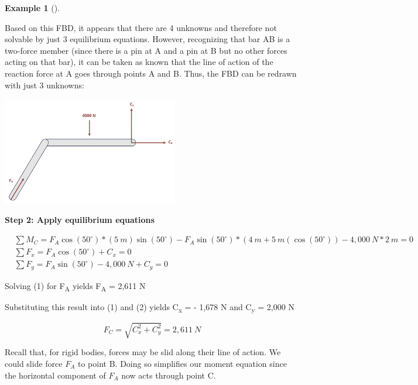 \documentclass[
  letterpaper,
  DIV=11,
  numbers=noendperiod]{scrreprt}
\theoremstyle{definition}
\newtheorem{example}{Example}[chapter]
\theoremstyle{remark}
\begin{document}
\begin{tcolorbox}
\begin{example}[]
\begin{tcolorbox}
Based on this FBD, it appears that there are 4 unknowns and therefore
not solvable by just 3 equilibrium equations. However, recognizing that
bar AB is a two-force member (since there is a pin at A and a pin at B
but no other forces acting on that bar), it can be taken as known that
the line of action of the reaction force at A goes through points A and
B. Thus, the FBD can be redrawn with just 3 unknowns:

\begin{center}
\includegraphics[width=3.03125in,height=\textheight]{images/Updated CH1 examples/example 1.2 part 3.png}
\end{center}

\textbf{Step 2: Apply equilibrium equations}

\[
\begin{aligned}
& \sum M_C=F_A \cos \left(50^{\circ}\right)*(5{~m}) \sin \left(50^{\circ}\right)-F_A \sin \left(50^{\circ}\right) *\left(4{~m}+5{~m}\left(\cos \left(50^{\circ}\right)\right)-4,000{~ N}*2{~m}=0\right. \\
& \sum F_x=F_A \cos \left(50^{\circ}\right)+C_x=0 \\
& \sum F_y=F_A \sin \left(50^{\circ}\right)-4,000{~N}+C_y=0
\end{aligned}
\]

Solving (1) for F\textsubscript{A} yields F\textsubscript{A} = 2,611 N

Substituting this result into (1) and (2) yields C\textsubscript{x} = -
1,678 N and C\textsubscript{y} = 2,000 N

\[
F_C=\sqrt{C_x^2+C_y^2}=2,611{~N}
\]

Recall that, for rigid bodies, forces may be slid along their line of
action. We could slide force \(F_A\) to point B. Doing so simplifies our
moment equation since the horizontal component of \(F_A\) now acts
through point C.


\end{tcolorbox}
\end{example}
\end{tcolorbox}
\end{document}
